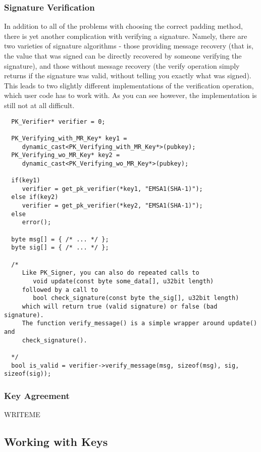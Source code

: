 \documentclass{article}
\begin{document}
\pagebreak

\subsubsection{Signature Verification}

In addition to all of the problems with choosing the correct padding method,
there is yet another complication with verifying a signature. Namely, there are
two varieties of signature algorithms - those providing message recovery (that
is, the value that was signed can be directly recovered by someone verifying
the signature), and those without message recovery (the verify operation simply
returns if the signature was valid, without telling you exactly what was
signed). This leads to two slightly different implementations of the
verification operation, which user code has to work with. As you can see
however, the implementation is still not at all difficult.

\begin{verbatim}
  PK_Verifier* verifier = 0;

  PK_Verifying_with_MR_Key* key1 =
     dynamic_cast<PK_Verifying_with_MR_Key*>(pubkey);
  PK_Verifying_wo_MR_Key* key2 =
     dynamic_cast<PK_Verifying_wo_MR_Key*>(pubkey);

  if(key1)
     verifier = get_pk_verifier(*key1, "EMSA1(SHA-1)");
  else if(key2)
     verifier = get_pk_verifier(*key2, "EMSA1(SHA-1)");
  else
     error();

  byte msg[] = { /* ... */ };
  byte sig[] = { /* ... */ };

  /*
     Like PK_Signer, you can also do repeated calls to
        void update(const byte some_data[], u32bit length)
     followed by a call to
        bool check_signature(const byte the_sig[], u32bit length)
     which will return true (valid signature) or false (bad signature).
     The function verify_message() is a simple wrapper around update() and
     check_signature().

  */
  bool is_valid = verifier->verify_message(msg, sizeof(msg), sig, sizeof(sig));
\end{verbatim}

\subsubsection{Key Agreement}

WRITEME

\pagebreak

\subsection{Working with Keys}
\end{document}

